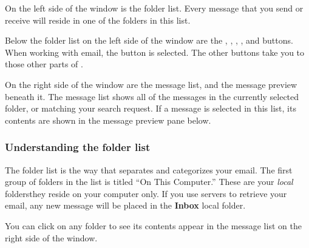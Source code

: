 On the left side of the window is the folder list. Every message that 
you send or receive will reside in one of the folders in this list.

Below the folder list on the left side of the window are the ,
, , , and 
buttons. When working with email, the  button is selected.
The other buttons take you to those other parts of .

On the right side of the window are the message list, and the message
preview beneath it. The message list shows all of the messages in the 
currently selected folder, or matching your search request. If a message
is selected in this list, its contents are shown in the message preview
pane below.

\subsubsection{Understanding the folder list}

The folder list is the way that  separates and categorizes your email.
The first group of folders in the list is titled ``On This Computer.'' These
are your \emph{local} folders\dash they reside on your computer only.
If you use  servers to retrieve your email, any new message will
be placed in the \textbf{Inbox} local folder.

You can click on any folder to see its contents appear in the message
list on the right side of the window.

